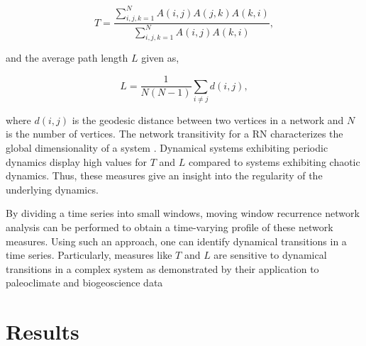\documentclass[letterpaper, 9pt, conference]{ieeeconf}
\begin{document}
\begin{equation}
T = \frac{\sum_{i,j,k = 1}^{N}A(i,j)A(j,k)A(k,i)}{\sum_{i,j,k = 1}^{N}A(i,j)A(k,i)},
\label{eq_3}
\end{equation}

and the average path length $L$ \cite{boccaletti2006complex} given as,

\begin{equation}
L =\frac{1}{N(N-1)}\sum_{ i\neq j} d(i,j),
\label{eq_4}
\end{equation}

where $d(i,j)$ is the geodesic distance between two vertices in a network and $N$ is the number of vertices. The network transitivity for a RN characterizes the global dimensionality of a system \cite{donner2011geometry}. Dynamical systems exhibiting periodic dynamics display high values for $T$ and $L$ compared to systems exhibiting chaotic dynamics. Thus, these measures give an insight into the regularity of the underlying dynamics. 

By dividing a time series into small windows, moving window recurrence network analysis can be performed to obtain a time-varying profile of these network measures. Using such an approach, one can identify dynamical transitions in a time series. Particularly, measures like $T$ and $L$ are sensitive to dynamical transitions in a complex system as demonstrated by their application to paleoclimate \cite{donner2011recurrence} and biogeoscience data \cite{lange2015recurrence} 


\section{Results}
\label{sec:results}
\end{document}
